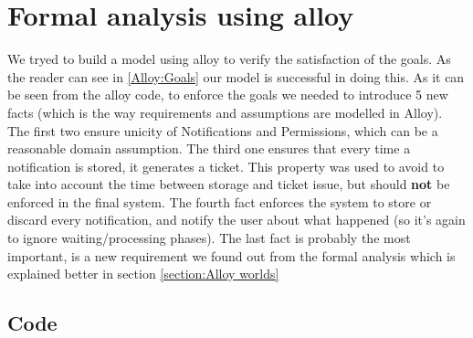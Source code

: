 \documentclass{article}
\begin{document}
\section{Formal analysis using alloy}
	We tryed to build a model using alloy to verify the satisfaction of the goals. As the reader can see in \ref{Alloy:Goals} our model is
	successful in doing this.
	As it can be seen from the alloy code, to enforce the goals we needed to introduce 5 new facts (which is the way requirements and assumptions 
	are modelled
	in Alloy). The first two ensure unicity of Notifications and Permissions, which can be a reasonable domain assumption. The third one ensures 
	that every time a notification is stored, it generates a ticket. This property was used to avoid to take into account the time between storage
	and ticket issue, but should \textbf{not} be enforced in the final system. The fourth fact enforces the system to store or
	discard every notification, and notify the user about what happened (so it's again to ignore waiting/processing phases).
	The last fact is probably the most important, is a new requirement we found out from the formal analysis which is explained better in section \ref{section:Alloy worlds}
	
	\subsection{Code}
	
\end{document}
